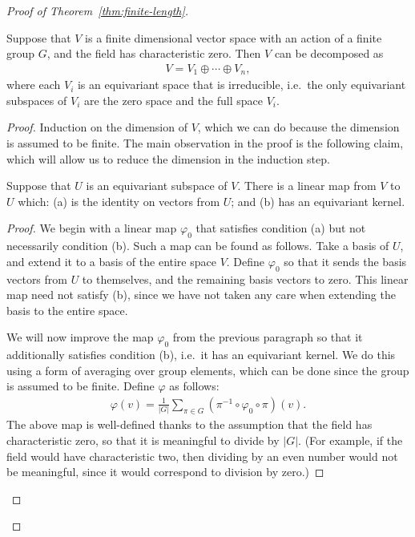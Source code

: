 \begin{proof}[Proof of Theorem~\ref{thm:finite-length}]
        \begin{theorem}
            Suppose that $V$ is a finite dimensional vector space with an action of a finite group $G$, and the field has characteristic zero. Then $V$ can be decomposed as 
            \begin{align*}
            V = V_1 \oplus \cdots \oplus V_n,
            \end{align*}
            where each $V_i$ is an equivariant space that is  irreducible, i.e.~the only equivariant subspaces of $V_i$ are the zero space  and the full space $V_i$.
        \end{theorem}
\begin{proof}
    Induction on the dimension of $V$, which we can do because the dimension is assumed to be finite. The main observation in the proof is the following claim, which will allow us to reduce the dimension in the induction step. 
    
    \begin{claim}
        Suppose that $U$ is an equivariant subspace of $V$. There is a linear map from $V$ to $U$ which: (a)  is the identity on vectors from $U$; and (b) has an equivariant kernel. 
    \end{claim}
    \begin{proof}
        We begin with a linear map $\varphi_0$ that satisfies condition (a) but not necessarily condition (b). Such a map can be found as follows. Take a basis of $U$, and extend it to a basis of the entire space $V$. Define $\varphi_0$ so that it sends the basis vectors from $U$ to themselves, and the remaining basis vectors to zero. This linear map need not satisfy (b), since we have not taken any care when extending the basis to the entire space. 

        We will now improve the map $\varphi_0$  from the previous paragraph so that it additionally satisfies condition (b), i.e.~it has an equivariant kernel. We do this using a form of averaging over group elements, which can be done since the group is assumed to be finite. Define $\varphi$ as follows:
        \begin{align*}
        \varphi(v) = \frac{1}{|G|}  \sum_{\pi \in G} (\pi^{-1} \circ \varphi_0 \circ \pi)(v).
        \end{align*}
        The above map is well-defined thanks to the assumption that the field has characteristic zero, so that it is meaningful to divide by $|G|$. (For example, if the field would have characteristic two, then dividing by an even number would not be meaningful, since it would correspond to division by zero.)
        

\end{proof}
\end{proof}
\end{proof}
